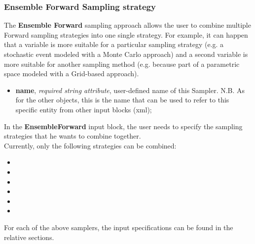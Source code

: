 \subsubsection{Ensemble Forward Sampling strategy}
\label{subsubsubsec:EnsembleSampler}
The \textbf{Ensemble Forward} sampling approach allows the user to combine multiple Forward sampling strategies
into one single strategy. For example, it can happen that a variable is more suitable for a particular sampling strategy (e.g. a
stochastic event
modeled with a Monte Carlo approach) and a second variable is more suitable for another sampling method (e.g. because part of a parametric space modeled with a Grid-based approach).
%
\attrsIntro
\vspace{-5mm}
\begin{itemize}
\itemsep0em
\item \textbf{name}, \textit{required string attribute}, user-defined name of this Sampler. N.B. As for the other objects, this is the name that can be used to refer to this specific entity from other input blocks (xml);
\end{itemize}
\vspace{-5mm}

In the \textbf{EnsembleForward} input block, the user needs to specify the sampling strategies that he wants to combine together.
\\Currently, only the following strategies can be combined:
\begin{itemize}
  \item {}
  \item {}
  \item {}
  \item {}
  \item {}
  \item {}
\end{itemize}
For each of the above samplers, the input specifications can be found in the relative sections.

